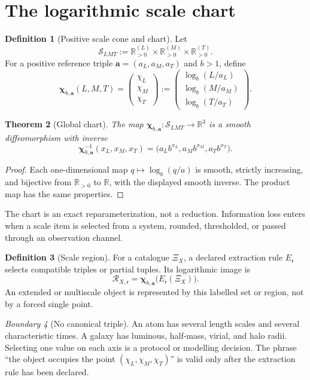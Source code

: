 \documentclass[11pt,a4paper]{article}
\theoremstyle{definition}
\newtheorem{definition}{Definition}[section]
\theoremstyle{plain}
\newtheorem{theorem}[definition]{Theorem}
\theoremstyle{remark}
\newtheorem{warning}[definition]{Boundary}
\newcommand{\R}{\mathbb{R}}
\newcommand{\Rpos}{\mathbb{R}_{>0}}
\newcommand{\Scal}{\mathcal{S}}
\newcommand{\chiL}{\chi_L}
\newcommand{\chiM}{\chi_M}
\newcommand{\chiT}{\chi_T}
\begin{document}
\section{The logarithmic scale chart}

\begin{definition}[Positive scale cone and chart]
Let
\[
\Scal_{LMT}:=
\R_{>0}^{(L)}\times\R_{>0}^{(M)}\times\R_{>0}^{(T)}.
\]
For a positive reference triple
$\bm a=(a_L,a_M,a_T)$ and $b>1$, define
\[
\bm\chi_{b,\bm a}(L,M,T)
=
\begin{pmatrix}
\chiL\\ \chiM\\ \chiT
\end{pmatrix}
:=
\begin{pmatrix}
\log_b(L/a_L)\\
\log_b(M/a_M)\\
\log_b(T/a_T)
\end{pmatrix}.
\]
\end{definition}

\begin{theorem}[Global chart]
\label{thm:global-chart}
The map $\bm\chi_{b,\bm a}:\Scal_{LMT}\to\R^3$ is a smooth
diffeomorphism with inverse
\[
 \bm\chi_{b,\bm a}^{-1}(x_L,x_M,x_T)
 =
 \bigl(a_Lb^{x_L},a_Mb^{x_M},a_Tb^{x_T}\bigr).
\]
\end{theorem}

\begin{proof}
Each one-dimensional map $q\mapsto\log_b(q/a)$ is smooth, strictly
increasing, and bijective from $\Rpos$ to $\R$, with the displayed smooth
inverse. The product map has the same properties.
\end{proof}

The chart is an exact reparameterization, not a reduction. Information
loss enters when a scale item is selected from a system, rounded,
thresholded, or passed through an observation channel.

\begin{definition}[Scale region]
For a catalogue $\Xi_X$, a declared extraction rule
$E_{\mathsf r}$ selects compatible triples or partial tuples. Its
logarithmic image is
\[
 \mathscr R_{X,\mathsf r}
 =
 \bm\chi_{b,\bm a}\bigl(E_{\mathsf r}(\Xi_X)\bigr).
\]
An extended or multiscale object is represented by this labelled set or
region, not by a forced single point.
\end{definition}

\begin{warning}[No canonical triple]
An atom has several length scales and several characteristic times. A
galaxy has luminous, half-mass, virial, and halo radii. Selecting one
value on each axis is a protocol or modelling decision. The phrase
``the object occupies the point $(\chi_L,\chi_M,\chi_T)$'' is valid only
after the extraction rule has been declared.
\end{warning}
\end{document}
